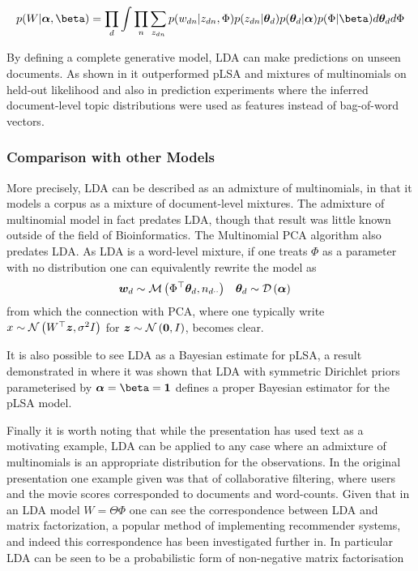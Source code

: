 \begin{align}
p(W | \vv{\alpha}, \vv{\beta}) = \prod_d \int \prod_n \sum_{z_{dn}} p(w_{dn}|z_{dn}, \Phi)p(z_{dn}|\thd)p(\thd|\vv{\alpha})p(\Phi|\vv{\beta}) d\thd d\Phi
\end{align}



By defining a complete generative model, LDA can make predictions on unseen documents. As shown in \cite{BleiNgJordan2003} it outperformed pLSA and mixtures of multinomials on held-out likelihood and also in prediction experiments where the inferred document-level topic distributions were used as features instead of bag-of-word vectors.

\subsubsection{Comparison with other Models}
More precisely, LDA can be described as an admixture of multinomials, in that it models a corpus as a mixture of document-level mixtures. The admixture of multinomial model\cite{Pritchard2000} in fact predates LDA, though that result was little known outside of the field of Bioinformatics. The Multinomial PCA algorithm\cite{Buntine2002} also predates LDA. As LDA is a word-level mixture, if one treats $\Phi$ as a parameter with no distribution one can equivalently rewrite the model as
\begin{align}
{  \bm w _d } & \sim \mathcal{M} \left( {\Phi^\top{  \bm \theta _d }},{n_{d\cdot\cdot}} \right) & { \bm \theta_d } & \sim \mathcal{D} \left( {\bm \alpha} \right)
\end{align}
from which the connection with PCA, where one typically write $x \sim \mathcal{N} \left( {W^\top\bm z}, {\sigma^2 I} \right)$ for $\bm z \sim \mathcal{N} \left( {\bm 0}, {I} \right)$, becomes clear.

It is also possible to see LDA as a Bayesian estimate for pLSA, a result demonstrated in \cite{GiKa2003} where it was shown that LDA with symmetric Dirichlet priors parameterised by $\vv{\alpha} = \vv{\beta} = \vv{1}$ defines a proper Bayesian estimator for the pLSA model. 

Finally it is worth noting that while the presentation has used text as a motivating example, LDA can be applied to any case where an admixture of multinomials is an appropriate distribution for the observations. In the original presentation\cite{BleiNgJordan2003} one example given was that of collaborative filtering, where users and the movie scores corresponded to documents and word-counts. Given that in an LDA model $W = \Theta \Phi$ one can see the correspondence between LDA and matrix factorization, a popular method of implementing recommender systems\cite{Salakhutdinov2007}, and indeed this correspondence has been investigated further in\cite{Agarwal2010}. In particular LDA can be seen to be a probabilistic form of non-negative matrix factorisation\cite{Lin2007}

